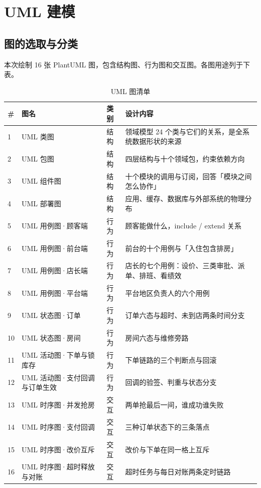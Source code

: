 \section{UML 建模}

\subsection{图的选取与分类}

本次绘制 16 张 PlantUML 图，包含结构图、行为图和交互图。各图用途列于下表。

\begin{table}[H]
\centering
\caption{UML 图清单}\label{tab:uml_list}
\tabfont
\begin{tabularx}{\textwidth}{@{}L{0.6cm}L{4.5cm}L{1.6cm}X@{}}
\toprule
\# & 图名 & 类别 & 设计内容 \\
 & UML 类图 & 结构 & 领域模型 24 个类与它们的关系，是全系统数据形状的来源 \\
2 & UML 包图 & 结构 & 四层结构与十个领域包，约束依赖方向 \\
3 & UML 组件图 & 结构 & 十个模块的调用与订阅，回答「模块之间怎么协作」 \\
4 & UML 部署图 & 结构 & 应用、缓存、数据库与外部系统的物理分布 \\
5 & UML 用例图·顾客端 & 行为 & 顾客能做什么，include / extend 关系 \\
6 & UML 用例图·前台端 & 行为 & 前台的十个用例与「入住包含排房」 \\
7 & UML 用例图·店长端 & 行为 & 店长的七个用例：设价、三类审批、派单、排班、看绩效 \\
8 & UML 用例图·平台端 & 行为 & 平台地区负责人的六个用例 \\
9 & UML 状态图·订单 & 行为 & 订单六态与超时、未到店两条时间分支 \\
10 & UML 状态图·房间 & 行为 & 房间六态与维修旁路 \\
11 & UML 活动图·下单与锁库存 & 行为 & 下单链路的三个判断点与回滚 \\
12 & UML 活动图·支付回调与订单生效 & 行为 & 回调的验签、判重与状态分支 \\
13 & UML 时序图·并发抢房 & 交互 & 两单抢最后一间，谁成功谁失败 \\
14 & UML 时序图·支付回调 & 交互 & 三种订单状态下的三条落点 \\
15 & UML 时序图·改价互斥 & 交互 & 改价与下单在同一格上互斥 \\
16 & UML 时序图·超时释放与对账 & 交互 & 超时任务与每日对账两条定时链路 \\
\bottomrule
\end{tabularx}
\end{table}

